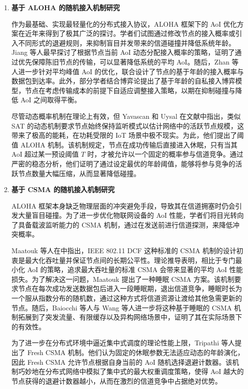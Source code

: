 \begin{enumerate}[wide]
    \item \textbf{基于 ALOHA 的随机接入机制研究}
    
    作为最基础、实现最轻量化的分布式接入协议，ALOHA 框架下的 AoI 优化方案在近年来得到了极其广泛的探讨。学者们试图通过修改节点的接入概率或引入不同形式的退避规则，来抑制盲目并发带来的信道碰撞并降低系统年龄。Jiang 等人最早探讨了根据节点当前 AoI 动态分配接入概率的策略，证明了通过优先保障陈旧节点的传输，可以显著降低系统的平均 AoI\cite{jiang2018can}。随后，Zhan 等人进一步针对平均峰值 AoI 的优化，联合设计了节点的基于年龄的接入概率与数据包到达率\cite{zhan2023peak}。此外，部分学者结合博弈论提出了基于年龄的自私接入博弈模型，节点在考虑传输成本的前提下自适应调整接入策略，以期在抑制碰撞与降低 AoI 之间取得平衡\cite{badia2023game}。

    尽管动态概率机制在理论上有效，但 Yavascan 和 Uysal 在文献\cite{yavascan2021analysis}中指出，类似 SAT 的动态机制要求节点始终保持监听模式以估计网络中的活跃节点规模，这带来了极高的能耗，在功耗受限的 IoT 场景中极不现实。为此，他们提出了阈值 ALOHA 机制。该机制规定，节点在成功传输后直接进入休眠，只有当其 AoI 超过某一预设阈值 $T$ 时，才被允许以一个固定的概率参与信道竞争。通过严密的稳态分析，他们证明了通过设定最优的年龄阈值，能够将参与竞争的活跃节点数量大幅压缩，从而显著降低碰撞。

    \item \textbf{基于 CSMA 的随机接入机制研究}
    
    ALOHA 框架本身缺乏物理层面的冲突避免手段，导致其在信道拥塞时仍会引发大量盲目碰撞。为了进一步优化物联网设备的 AoI 性能，学者们将目光转向了具备载波监听能力的 CSMA 机制，通过在发送前进行信道探测，来降低冲突概率。

    Maatouk 等人在\cite{maatouk2020age}中指出，IEEE 802.11 DCF 这种标准的 CSMA 机制的设计初衷是最大化吞吐量并保证节点间的长期公平性。理论推导表明，相比于专门最小化 AoI 的策略，追求最大吞吐量的标准 CSMA 会带来显著的平均 AoI 性能损失。为了解决这一问题，Maatouk 提出了一种睡眠 CSMA 方案。该机制要求节点在每次成功发送数据包后进入一段睡眠期，退出信道竞争，睡眠时长为一个服从指数分布的随机数，通过这种方式将信道资源让渡给其他急需更新的节点。随后，Baiocchi 等人与 Wang 等人进一步将这种基于睡眠的 CSMA 机制拓展到了突发流量、有限缓存以及异构网络场景中，证明了其在实际场景下的有效性\cite{baiocchi2020age}\cite{wang2024analytical}。

    为了进一步在分布式环境中逼近集中式调度的理论性能上限，Tripathi 等人提出了 Fresh CSMA 机制\cite{tripathi2023fresh}。他们认为固定的休眠参数无法适应动态的年龄演化，因此 Fresh CSMA 允许节点根据自身当前的 AoI 随机选择退避计数器。该机制巧妙地在分布式网络中模拟了集中式的最大权重调度策略，使得 AoI 越大的节点获得的退避计数器越小，从而在激烈的信道竞争中占据绝对优势。


\end{enumerate}
